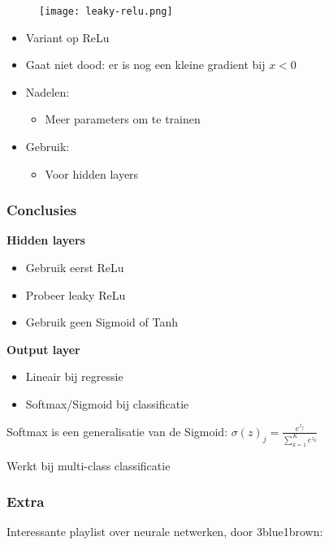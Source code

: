 \documentclass{article}
\begin{document}
\begin{figure}[H]
    \centering
    \texttt{[image: leaky-relu.png]}
\end{figure}


\begin{itemize}
    \item Variant op ReLu
    \item Gaat niet dood: er is nog een kleine gradient bij $x < 0$
    \item Nadelen:
    \begin{itemize}
        \item Meer parameters om te trainen
    \end{itemize}
    \item Gebruik:
    \begin{itemize}
        \item Voor hidden layers
    \end{itemize}
\end{itemize}

\subsubsection{Conclusies}

\textbf{Hidden layers}

\begin{itemize}
    \item Gebruik eerst ReLu
    \item Probeer leaky ReLu
    \item Gebruik geen Sigmoid of Tanh
\end{itemize}

\textbf{Output layer}

\begin{itemize}
    \item Lineair bij regressie
    \item Softmax/Sigmoid bij classificatie
\end{itemize}

Softmax is een generalisatie van de Sigmoid: $\sigma(z)_j = \frac{e^{z_j}}{\sum_{k=1}^K e^{z_k}}$

Werkt bij multi-class classificatie

\subsubsection{Extra}

Interessante playlist over neurale netwerken, door 3blue1brown:
\end{document}
